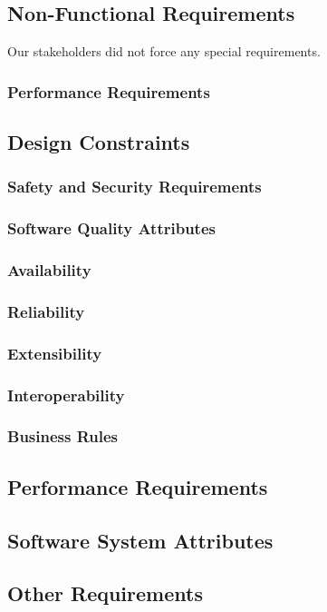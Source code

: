 \subsection{Non-Functional Requirements}
Our stakeholders did not force any special requirements.

\subsubsection{Performance Requirements}
\subsection{Design Constraints}
\subsubsection{Safety and Security Requirements}
\subsubsection{Software Quality Attributes}
\subsubsection{Availability}
\subsubsection{Reliability}
\subsubsection{Extensibility}
\subsubsection{Interoperability}
\subsubsection{Business Rules}

\subsection{Performance Requirements}

\subsection{Software System Attributes}


\subsection{Other Requirements}
